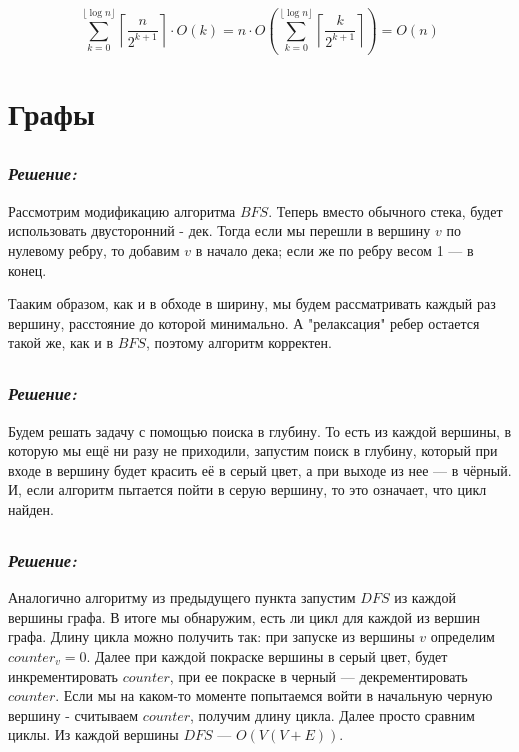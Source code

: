 \documentclass[a4paper, 12pt]{article}
\newcommand*\circled[1]{\tikz[baseline=(char.base)]{
            \node[shape=circle,draw,inner sep=2pt] (char) {#1};}}
\begin{document}
\[\sum_{k=0}^{\lfloor\log{n}\rfloor} \left\lceil\frac{n}{2^{k+1}}\right\rceil \cdot O(k) = n\cdot O\left(\sum_{k=0}^{\lfloor\log{n}\rfloor} \left\lceil\frac{k}{2^{k+1}}\right\rceil\right)= O(n)\]

\section*{Графы}

\subsection*{\circled{1}} 
\subsubsection*{\textit{Решение:}}

Рассмотрим модификацию алгоритма $BFS$. Теперь вместо обычного стека, будет использовать двусторонний - дек. Тогда если мы перешли в вершину $v$ по нулевому ребру, то добавим $v$ в начало дека; если же по ребру весом 1 — в конец.

Тааким образом, как и в обходе в ширину, мы будем рассматривать каждый раз вершину, расстояние до которой минимально. А "релаксация" ребер остается такой же, как и в $BFS$, поэтому алгоритм корректен.

\subsection*{\circled{2}} 
\subsubsection*{\textit{Решение:}}

Будем решать задачу с помощью поиска в глубину. То есть из каждой вершины, в которую мы ещё ни разу не приходили, запустим поиск в глубину, который при входе в вершину будет красить её в серый цвет, а при выходе из нее — в чёрный. И, если алгоритм пытается пойти в серую вершину, то это означает, что цикл найден.

\subsection*{\circled{3}} 
\subsubsection*{\textit{Решение:}}

Аналогично алгоритму из предыдущего пункта запустим $DFS$ из каждой вершины графа. В итоге мы обнаружим, есть ли цикл для каждой из вершин графа. Длину цикла можно получить так: при запуске из вершины $v$ определим $counter_v = 0$. Далее при каждой покраске вершины в серый цвет, будет инкрементировать $counter$, при ее покраске в черный — декрементировать $counter$. Если мы на каком-то моменте попытаемся войти в начальную черную вершину - считываем $counter$, получим длину цикла. Далее просто сравним циклы. Из каждой вершины $DFS$ — $O(V(V+E))$.
\end{document}
